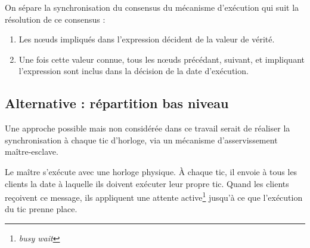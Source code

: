 \documentclass{article}
\newcommand\trigger{point d'interaction\xspace}
\begin{document}
On sépare la synchronisation du consensus du mécanisme d'exécution qui suit la résolution de ce consensus : 
\begin{enumerate}
    \item Les nœuds impliqués dans l'expression décident de la valeur de vérité.
    \item Une fois cette valeur connue, tous les nœuds précédant, suivant, et impliquant l'expression sont inclus dans la décision de la date d'exécution.
\end{enumerate}







\subsection{Alternative : répartition bas niveau}
Une approche possible mais non considérée dans ce travail serait de réaliser la synchronisation à chaque tic d'horloge, via un mécanisme d'asservissement maître-esclave.

Le maître s'exécute avec une horloge physique.
À chaque tic, il envoie à tous les clients la date à laquelle ils doivent exécuter leur propre tic. 
Quand les clients reçoivent ce message, ils appliquent une attente active\footnote{\textit{busy wait}} jusqu'à ce que l'exécution du tic prenne place.
\end{document}
